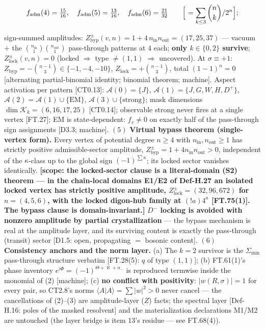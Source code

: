 \begin{theorem}
\[
f_{\mathrm{adm}}(4)=\tfrac{15}{16},\quad f_{\mathrm{adm}}(5)=\tfrac{13}{16},\quad f_{\mathrm{adm}}(6)=\tfrac{21}{32}\qquad\Bigl[\ =\sum_{k\le3}\binom nk/2^n\Bigr];
\]

sign-summed amplitudes: $Z_{\mathrm{byp}}^{\pm}(v,n)=1+4\,n_{\mathrm{in}}n_{\mathrm{out}}=(17,25,37)$ — vacuum $+$ the $\binom{n_{\mathrm{in}}}{1}\binom{n_{\mathrm{out}}}{1}$ pass-through patterns at $4$ each; \textbf{only $k\in\{0,2\}$ survive}; $Z_{\mathrm{lock}}^{\pm}(v,n)=0$ (locked $\Rightarrow$ type $\ne(1,1)$ $\Rightarrow$ uncovered). At $\sigma\equiv+1$: $Z_{\mathrm{byp}}=-\binom{n-1}{3}\in\{-1,-4,-10\}$, $Z_{\mathrm{lock}}=+\binom{n-1}{3}$, total $(1-1)^n=0$ [alternating partial-binomial identity; binomial theorem; machine]. Aspect activation per pattern [CT0.13]: $\mathcal A(0)=\{J\}$, $\mathcal A(1)=\{J,G,W,H,D^+\}$, $\mathcal A(2)=\mathcal A(1)\cup\{\mathrm{EM}\}$, $\mathcal A(3)\cup\{\text{strong}\}$; mask dimensions $\dim\mathcal K_k=(6,16,17,25)$ [CT0.14]; observable strong never fires at a single vertex [FT.27]; EM is state-dependent: $f_v\ne0$ on exactly half of the pass-through sign assignments [D3.3; machine]. $(5)$ \textbf{Virtual bypass theorem (single-vertex form).} Every vertex of potential degree $n\ge4$ with $n_{\mathrm{in}},n_{\mathrm{out}}\ge1$ has strictly positive admissible-sector amplitude, $Z_{\mathrm{byp}}^{\pm}=1+4n_{\mathrm{in}}n_{\mathrm{out}}>0$, independent of the $\kappa$-class up to the global sign $(-1)^{\sum\kappa}$; its locked sector vanishes identically. \textbf{[scope: the locked-sector clause is a literal-domain (S2) theorem — in the chain-local domains E1/E2 of Def-H.27 an isolated locked vertex has strictly positive amplitude, $Z^{\pm}_{\mathrm{lock}}=(32,96,672)$ for $n=(4,5,6)$, with the locked digon-hub family at $(!a)4^a$ [FT.75(1)]. The bypass clause is domain-invariant.]} \textbf{$D^-$ locking is avoided with nonzero amplitude by partial crystallization} — the bypass mechanism is real at the amplitude layer, and its surviving content is exactly the pass-through (transit) sector [D1.5: open, propagating $=$ bosonic content]. $(6)$ \textbf{Consistency anchors and the norm layer.} (a) The $k{=}2$ survivor is the $\Sigma_{\min}$ pass-through structure verbatim [FT.28(5): $q$ of type $(1,1)$]; (b) FT.61(1)'s phase inventory $e^{i\Phi}=(-1)^{\Theta+\aleph+n_-}$ is reproduced termwise inside the monomial of (2) [machine]; (c) \textbf{no conflict with positivity}: $|w(R,\sigma)|=1$ for every pair, so CT2.8's norms $\langle A|A\rangle=\sum|w|^2>0$ never cancel — the cancellations of (2)–(3) are amplitude-layer ($Z$) facts; the spectral layer [Def-H.16: poles of the masked resolvent] and the materialization declarations M1/M2 are untouched (the layer bridge is item 13's residue — see FT.68(4)).


\end{theorem}
